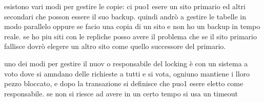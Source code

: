 esistono vari modi per gestire le copie: ci puo1 esere un sito primario ed altri secondari che posson essere il suo backup. quindi andrò a gestire le tabelle in modo parallelo oppure se facio una copia di un sito e non ho un backup in tempo reale. se ho piu siti con le repliche posso avere il problema che se il sito primario fallisce dovrò elegere un altro sito come quello successore del primario.

uno dei modi per gestire il nuov o responsabile del locking è con un sistema a voto dove si amndano delle richieste a tutti e si vota, ogniuno mantiene i lloro pezzo bloccato, e dopo la transazione si definisce che puo1 esere eletto come responsabile. se non si riesce ad avere in un certo tempo si usa un timeout